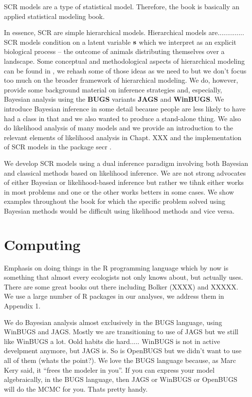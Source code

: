 SCR models are a type of statistical model. Therefore, 
the book is basically an applied statistical modeling book.

In essence, SCR
are simple hierarchical models. 
Hierarchical models are..............
SCR models condition on a latent variable ${\bf s}$ which we interpret
as an explicit biological process -- the outcome of animals
distributing themselves over a landscape.  Some conceptual and
methodological aspects of hierarchical modeling can be found in
\citet{royle_dorazio:2008}, we rehash some of those ideas as we need
to but we don't focus too much on the broader framework of
hierarchical modeling.
We do, however, 
 provide some background material on inference strategies and,
 especially, Bayesian analysis using the  {\bf BUGS} variants {\bf
   JAGS} and {\bf WinBUGS}. We introduce Bayesian inference in some
 detail because people are less likely to have had a class in that and
 we also wanted to produce a stand-alone thing.   We also do
 likelihood analysis of many models and we provide an introduction to
 the relevant elements of likelihood analysis in Chapt. XXX and the
 implementation of SCR models in the package secr \citep{efford_etal:2009euring}.

We develop SCR models using a dual inference paradigm involving both
Bayesian and classical methods based on likelihood inference.
We are not strong advocates of either Bayesian or likelihood-based
inference but rather we tihnk either works in most problems and one or
the other works betters in some cases. 
We show examples throughout the
book for which the specific problem solved using Bayesian methods
would be difficult using likelihood methods and vice versa.


\section*{Computing}

Emphasis on doing things in the 
R programming language which by now is something that almost every
ecologists not only knows about, but actually uses.  There are some
great books out there including Bolker (XXXX) and XXXXX. We use a
large number of R packages in our analyses, we address them in
Appendix 1.

We do Bayesian analysis almost exclusively in the BUGS language, using
WinBUGS and JAGS. Mostly we are transitioning to use of JAGS but we
still like WinBUGS a lot. Oold habits die hard..... WinBUGS is not in
active develpment anymore, but JAGS is. So is OpenBUGS but we didn't
want to use all of them (whats the point?). We love the BUGS language
because, as Marc Kery said, it ``frees the modeler in you''.
If you can express your model algebraically, in the BUGS language,
then JAGS or WinBUGS or OpenBUGS will do the MCMC for you. Thats
pretty handy.


